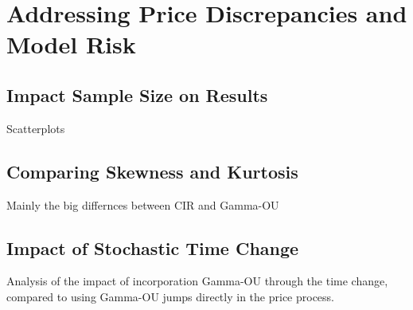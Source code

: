 
\section{Addressing Price Discrepancies and Model Risk}
\subsection{Impact Sample Size on Results}
Scatterplots

\subsection{Comparing Skewness and Kurtosis}
Mainly the big differnces between CIR and Gamma-OU

\subsection{Impact of Stochastic Time Change}
Analysis of the impact of incorporation Gamma-OU through the time change, compared to using Gamma-OU jumps directly in the price process. 